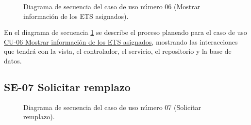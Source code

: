 \begin{figure}[htbp!]
	\begin{center}
		\caption{Diagrama de secuencia del caso de uso número 06 (Mostrar información de los ETS asignados).}
		\label{fig:Diagrama de secuencia CU-06}
	\end{center}
\end{figure}

En el diagrama de secuencia \ref{fig:Diagrama de secuencia CU-06} se describe el proceso planeado para el caso de uso \hyperlink{CU-06}{CU-06 Mostrar información de los ETS asignados}, mostrando las interacciones que tendrá con la vista, el controlador, el servicio, el repositorio y la base de datos.

\newpage

\subsection{SE-07 Solicitar remplazo}

\begin{figure}[htbp!]
	\begin{center}
		\caption{Diagrama de secuencia del caso de uso número 07 (Solicitar remplazo).}
		\label{fig:Diagrama de secuencia CU-07}
	\end{center}
\end{figure}

